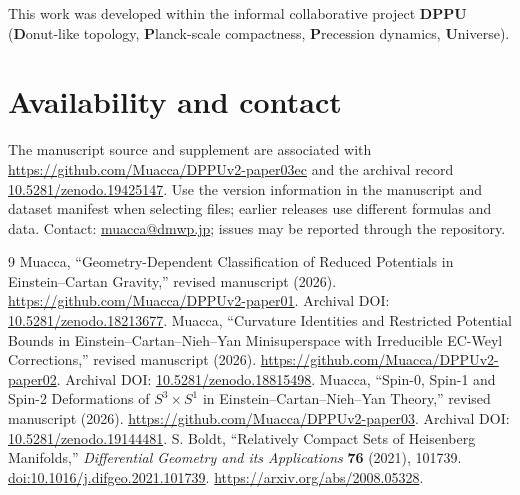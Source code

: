 \documentclass[11pt,a4paper]{article}
\begin{document}
This work was developed within the informal collaborative project
\textbf{DPPU} (\textbf{D}onut-like topology, \textbf{P}lanck-scale
compactness, \textbf{P}recession dynamics, \textbf{U}niverse).
\section*{Availability and contact}
The manuscript source and supplement are associated with
\url{https://github.com/Muacca/DPPUv2-paper03ec} and the archival record
\href{https://doi.org/10.5281/zenodo.19425147}{10.5281/zenodo.19425147}.
Use the version information in the manuscript and dataset manifest when
selecting files; earlier releases use different formulas and data.
Contact: \href{mailto:muacca@dmwp.jp}{muacca@dmwp.jp}; issues may be reported
through the repository.
\appendix





\begin{thebibliography}{9}
 Muacca, ``Geometry-Dependent Classification of Reduced
Potentials in Einstein--Cartan Gravity,'' revised manuscript (2026).
\url{https://github.com/Muacca/DPPUv2-paper01}.
Archival DOI: \href{https://doi.org/10.5281/zenodo.18213677}{10.5281/zenodo.18213677}.
 Muacca, ``Curvature Identities and Restricted Potential Bounds
in Einstein--Cartan--Nieh--Yan Minisuperspace with Irreducible EC-Weyl
Corrections,'' revised manuscript (2026).
\url{https://github.com/Muacca/DPPUv2-paper02}.
Archival DOI: \href{https://doi.org/10.5281/zenodo.18815498}{10.5281/zenodo.18815498}.
 Muacca, ``Spin-0, Spin-1 and Spin-2 Deformations of
$S^3\times S^1$ in Einstein--Cartan--Nieh--Yan Theory,'' revised manuscript
(2026). \url{https://github.com/Muacca/DPPUv2-paper03}.
Archival DOI: \href{https://doi.org/10.5281/zenodo.19144481}{10.5281/zenodo.19144481}.
 S. Boldt, ``Relatively Compact Sets of Heisenberg Manifolds,''
\emph{Differential Geometry and its Applications} \textbf{76} (2021), 101739.
\href{https://doi.org/10.1016/j.difgeo.2021.101739}{doi:10.1016/j.difgeo.2021.101739}.
\url{https://arxiv.org/abs/2008.05328}.
\end{thebibliography}
\end{document}
